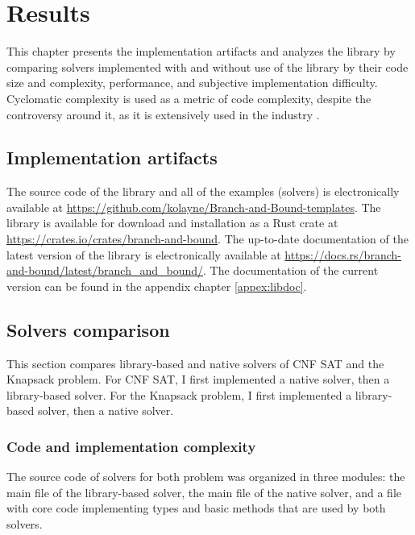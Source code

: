 \chapter{Results}
\label{chap:res}

This chapter presents the implementation artifacts and analyzes the library by comparing
solvers implemented with and without use of the library by their code size and
complexity, performance, and subjective implementation difficulty. Cyclomatic complexity
\cite{ebert2016cyclomatic} is used as a metric of code complexity,
despite the controversy around it, as it is extensively used in the industry
\cite{ebert2016cyclomatic}.

\section{Implementation artifacts}

The source code of the library and all of the examples (solvers) is electronically
available at \url{https://github.com/kolayne/Branch-and-Bound-templates}. The library
is available for download and installation as a Rust crate at
\url{https://crates.io/crates/branch-and-bound}.
The up-to-date documentation of the latest version of the library is electronically
available at \url{https://docs.rs/branch-and-bound/latest/branch_and_bound/}.
The documentation of the current version can be found in the appendix chapter \ref{appex:libdoc}.

\section{Solvers comparison}

This section compares library-based and native solvers of CNF SAT and the Knapsack problem.
For CNF SAT, I first implemented a native solver, then a library-based
solver. For the Knapsack problem, I first implemented a library-based solver, then a
native solver.

\subsection{Code and implementation complexity}

The source code of solvers for both problem was organized in three modules:
the main file of the library-based solver, the main file of the native solver, and a file
with core code implementing types and basic methods that are used by both solvers.

